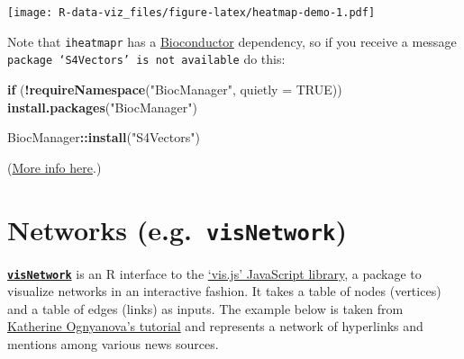\documentclass[]{book}
\newenvironment{Shaded}{\begin{snugshade}}{\end{snugshade}}
\newcommand{\ControlFlowTok}[1]{\textcolor[rgb]{0.13,0.29,0.53}{\textbf{#1}}}
\newcommand{\DataTypeTok}[1]{\textcolor[rgb]{0.13,0.29,0.53}{#1}}
\newcommand{\KeywordTok}[1]{\textcolor[rgb]{0.13,0.29,0.53}{\textbf{#1}}}
\newcommand{\NormalTok}[1]{#1}
\newcommand{\OperatorTok}[1]{\textcolor[rgb]{0.81,0.36,0.00}{\textbf{#1}}}
\newcommand{\OtherTok}[1]{\textcolor[rgb]{0.56,0.35,0.01}{#1}}
\newcommand{\StringTok}[1]{\textcolor[rgb]{0.31,0.60,0.02}{#1}}
\begin{document}
\texttt{[image: R-data-viz\_files/figure-latex/heatmap-demo-1.pdf]}

Note that \texttt{iheatmapr} has a \href{https://bioconductor.org}{Bioconductor} dependency, so if you receive a message \texttt{package\ ‘S4Vectors’\ is\ not\ available} do this:

\begin{Shaded}
\begin{Highlighting}[]
\ControlFlowTok{if}\NormalTok{ (}\OperatorTok{!}\KeywordTok{requireNamespace}\NormalTok{(}\StringTok{"BiocManager"}\NormalTok{, }\DataTypeTok{quietly =} \OtherTok{TRUE}\NormalTok{))}
    \KeywordTok{install.packages}\NormalTok{(}\StringTok{"BiocManager"}\NormalTok{)}

\NormalTok{BiocManager}\OperatorTok{::}\KeywordTok{install}\NormalTok{(}\StringTok{"S4Vectors"}\NormalTok{)}
\end{Highlighting}
\end{Shaded}

(\href{http://www.bioconductor.org/packages/release/bioc/html/S4Vectors.html}{More info here}.)

\hypertarget{networks-e.g.-visnetwork}{%
\section{\texorpdfstring{Networks (e.g.~\textbf{\texttt{visNetwork}})}{Networks (e.g.~visNetwork)}}\label{networks-e.g.-visnetwork}}

\href{https://CRAN.R-project.org/package=visNetwork}{\textbf{\texttt{visNetwork}}} is an R interface to the \href{http://visjs.org/}{`vis.js' JavaScript library}, a package to visualize networks in an interactive fashion. It takes a table of nodes (vertices) and a table of edges (links) as inputs. The example below is taken from \href{http://kateto.net/network-visualization}{Katherine Ognyanova's tutorial} and represents a network of hyperlinks and mentions among various news sources.
\end{document}
